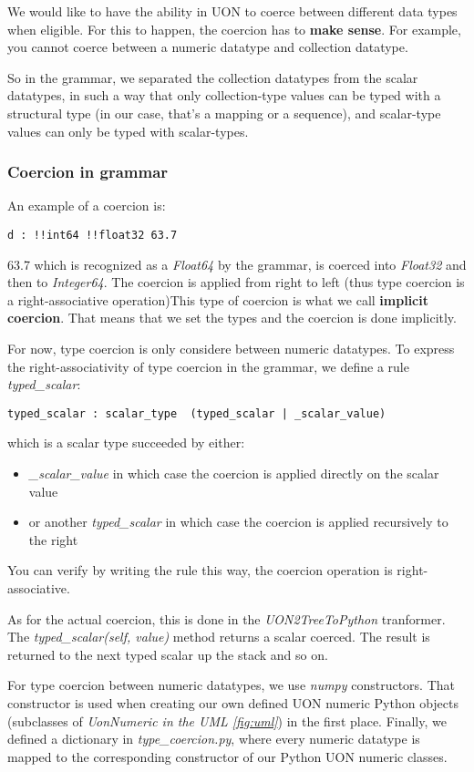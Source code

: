 \documentclass[12pt]{article}
\begin{document}
We would like to have the ability in UON to coerce between different data types when eligible. For this to happen, the coercion has to \textbf{make sense}. For example, you cannot coerce between a numeric datatype and collection datatype. 

So in the grammar, we separated the collection datatypes from the scalar datatypes, in such a way that only collection-type values can be typed with a structural type (in our case, that's a mapping or a sequence), and scalar-type values can only be typed with scalar-types.

\subsubsection{Coercion in grammar}
An example of a coercion is:
\begin{lstlisting}
d : !!int64 !!float32 63.7
\end{lstlisting}
63.7 which is recognized as a \emph{Float64} by the grammar, is coerced into \emph{Float32} and then to \emph{Integer64}. The coercion is applied from right to left (thus type coercion is a  right-associative operation)This type of coercion is what we call 
\textbf{implicit coercion}.
That means that we set the types and the coercion is done implicitly.

For now, type coercion is only considere between numeric datatypes. To express the right-associativity of type coercion in the grammar, we define a rule \emph{typed\_scalar}:
\begin{lstlisting}
typed_scalar : scalar_type  (typed_scalar | _scalar_value)
\end{lstlisting}
which is a scalar type succeeded by either:
\begin{itemize}
    \item \emph{\_scalar\_value} in which case the coercion is applied directly on the scalar value
    \item or another \emph{typed\_scalar} in which case the coercion is applied recursively to the right 
\end{itemize}
You can verify by writing the rule this way, the coercion operation is right-associative.

As for the actual coercion, this is done in the \emph{UON2TreeToPython} tranformer. The \emph{typed\_scalar(self, value)} method returns a scalar coerced. The result is returned to the next typed scalar up the stack and so on. 

For type coercion between numeric datatypes, we use \emph{numpy} constructors. That constructor is used when creating our own defined UON numeric Python objects (subclasses of \emph{UonNumeric in the UML \ref{fig:uml}}) in the first place. Finally, we defined a dictionary in \emph{type\_coercion.py}, where every numeric datatype is mapped to the corresponding constructor of our Python UON numeric classes.
\end{document}
